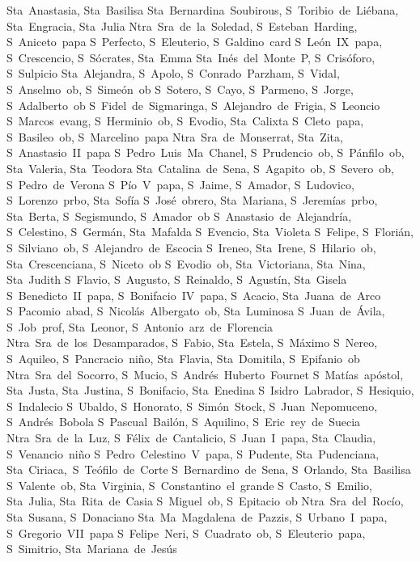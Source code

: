 Sta~Anastasia, Sta~Basilisa
Sta~Bernardina~Soubirous, S~Toribio~de~Li\'ebana, Sta~Engracia, Sta~Julia
Ntra~Sra~de~la~Soledad, S~Esteban~Harding, S~Aniceto~papa
S~Perfecto, S~Eleuterio, S~Galdino~card
S~Le\'on~IX~papa, S~Crescencio, S~S\'ocrates, Sta~Emma
Sta~In\'es~del~Monte~P, S~Cris\'oforo, S~Sulpicio
Sta~Alejandra, S~Apolo, S~Conrado~Parzham, S~Vidal, S~Anselmo~ob, S~Sime\'on~ob%
S~Sotero, S~Cayo, S~Parmeno, 
S~Jorge, S~Adalberto~ob
S~Fidel~de~Sigmaringa, S~Alejandro~de~Frigia, S~Leoncio
S~Marcos~evang, S~Herminio~ob, S~Evodio, Sta~Calixta
S~Cleto~papa, S~Basileo~ob, S~Marcelino~papa
Ntra~Sra~de~Monserrat, Sta~Zita, S~Anastasio~II~papa
S~Pedro~Luis~Ma~Chanel, S~Prudencio~ob, S~P\'anfilo~ob, Sta~Valeria, Sta~Teodora
Sta~Catalina~de~Sena, S~Agapito~ob, S~Severo~ob, S~Pedro~de~Verona
S~P\'io~V~papa, S~Jaime, S~Amador, S~Ludovico, S~Lorenzo~prbo, Sta~Sof\'ia
S~Jos\'e~obrero, Sta~Mariana, S~Jerem\'ias~prbo, Sta~Berta, S~Segismundo, S~Amador~ob
S~Anastasio~de~Alejandr\'ia, S~Celestino, S~Germ\'an, Sta~Mafalda
S~Evencio, Sta~Violeta
S~Felipe, S~Flori\'an, S~Silviano~ob, S~Alejandro~de~Escocia
S~Ireneo, Sta~Irene, S~Hilario~ob, Sta~Crescenciana, S~Niceto~ob
S~Evodio~ob, Sta~Victoriana, Sta~Nina, Sta~Judith
S~Flavio, S~Augusto, S~Reinaldo, S~Agust\'in, Sta~Gisela
S~Benedicto~II~papa, S~Bonifacio~IV~papa, S~Acacio, Sta~Juana~de~Arco
S~Pacomio~abad, S~Nicol\'as~Albergato~ob, Sta~Luminosa
S~Juan~de~\'Avila, S~Job~prof, Sta~Leonor, S~Antonio~arz~de~Florencia
Ntra~Sra~de~los~Desamparados, S~Fabio, Sta~Estela, S~M\'aximo
S~Nereo, S~Aquileo, S~Pancracio~ni\~no, Sta~Flavia, Sta~Domitila, S~Epifanio~ob
Ntra~Sra~del~Socorro, S~Mucio, S~Andr\'es~Huberto~Fournet
S~Mat\'ias~ap\'ostol, Sta~Justa, Sta~Justina, S~Bonifacio, Sta~Enedina
S~Isidro~Labrador, S~Hesiquio, S~Indalecio
S~Ubaldo, S~Honorato, S~Sim\'on~Stock, S~Juan~Nepomuceno, S~Andr\'es~Bobola
S~Pascual~Bail\'on, S~Aquilino, S~Eric~rey~de~Suecia
Ntra~Sra~de~la~Luz, S~F\'elix~de~Cantalicio, S~Juan~I~papa, Sta~Claudia, S~Venancio~ni\~no%
S~Pedro~Celestino~V~papa, S~Pudente, Sta~Pudenciana, Sta~Ciriaca,~S~Te\'ofilo~de~Corte
S~Bernardino~de~Sena, S~Orlando, Sta~Basilisa
S~Valente~ob, Sta~Virginia, S~Constantino~el~grande
S~Casto, S~Emilio, Sta~Julia, Sta~Rita~de~Casia
S~Miguel~ob, S~Epitacio~ob
Ntra~Sra~del~Roc\'io, Sta~Susana, S~Donaciano
Sta~Ma~Magdalena~de~Pazzis, S~Urbano~I~papa, S~Gregorio~VII~papa
S~Felipe~Neri, S~Cuadrato~ob, S~Eleuterio~papa, S~Simitrio, Sta~Mariana~de~Jes\'us
